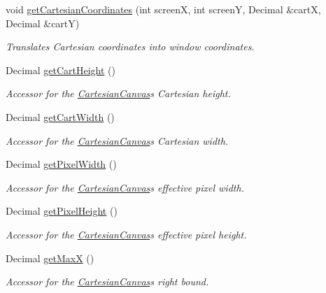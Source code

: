 \begin{DoxyCompactItemize}
void \hyperlink{classtsgl_1_1_cartesian_canvas_a736935074bb6d90bcc0c7af2edd8a4aa}{get\+Cartesian\+Coordinates} (int screen\+X, int screen\+Y, Decimal \&cart\+X, Decimal \&cart\+Y)
\begin{DoxyCompactList}\small\item\em Translates Cartesian coordinates into window coordinates. \end{DoxyCompactList}\item 
Decimal \hyperlink{classtsgl_1_1_cartesian_canvas_a66657636eaf20ff465898d3f932063ce}{get\+Cart\+Height} ()
\begin{DoxyCompactList}\small\item\em Accessor for the \hyperlink{classtsgl_1_1_cartesian_canvas}{Cartesian\+Canvas}\textquotesingle{}s Cartesian height. \end{DoxyCompactList}\item 
Decimal \hyperlink{classtsgl_1_1_cartesian_canvas_a829a97323261515097b7589bc96c109c}{get\+Cart\+Width} ()
\begin{DoxyCompactList}\small\item\em Accessor for the \hyperlink{classtsgl_1_1_cartesian_canvas}{Cartesian\+Canvas}\textquotesingle{}s Cartesian width. \end{DoxyCompactList}\item 
Decimal \hyperlink{classtsgl_1_1_cartesian_canvas_ac9bb990b8c34a1575bcb861e4b819372}{get\+Pixel\+Width} ()
\begin{DoxyCompactList}\small\item\em Accessor for the \hyperlink{classtsgl_1_1_cartesian_canvas}{Cartesian\+Canvas}\textquotesingle{}s effective pixel width. \end{DoxyCompactList}\item 
Decimal \hyperlink{classtsgl_1_1_cartesian_canvas_a699c2b41b3b46bfac8649fb38b24c901}{get\+Pixel\+Height} ()
\begin{DoxyCompactList}\small\item\em Accessor for the \hyperlink{classtsgl_1_1_cartesian_canvas}{Cartesian\+Canvas}\textquotesingle{}s effective pixel height. \end{DoxyCompactList}\item 
Decimal \hyperlink{classtsgl_1_1_cartesian_canvas_ae3cbac386f78ecff082b8c4cbd9081ed}{get\+Max\+X} ()
\begin{DoxyCompactList}\small\item\em Accessor for the \hyperlink{classtsgl_1_1_cartesian_canvas}{Cartesian\+Canvas}\textquotesingle{}s right bound. \end{DoxyCompactList}\item 

\end{DoxyCompactItemize}
